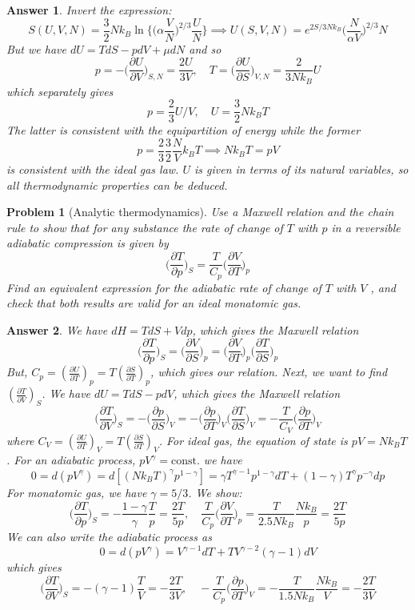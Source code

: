 \documentclass[a4paper]{article}
\theoremstyle{new2}
\newtheorem{ans}{Answer}[section]
\theoremstyle{new}
\newtheorem{qns}{Problem}[section]
\begin{document}
\begin{ans}
Invert the expression:
$$S(U,V,N)=\frac{3}{2}Nk_B\ln\bigg\{\bigg(\alpha\frac{V}{N}\bigg)^{2/3}\frac{U}{N}\bigg\}\implies U(S,V,N)=e^{2S/3Nk_B}\bigg(\frac{N}{\alpha V}\bigg)^{2/3}N$$
But we have $dU=TdS-pdV+\mu dN$ and so
$$p=-\bigg(\frac{\partial U}{\partial V}\bigg)_{S,N}=\frac{2U}{3V},\quad T=\bigg(\frac{\partial U}{\partial S}\bigg)_{V,N}=\frac{2}{3Nk_B}U$$
which separately gives 
$$p=\frac{2}{3}U/V,\quad U=\frac{3}{2}Nk_BT$$
The latter is consistent with the equipartition of energy while the former
$$p=\frac{2}{3}\frac{3}{2}\frac{N}{V}k_BT\implies Nk_BT=pV$$
is consistent with the ideal gas law. $U$ is given in terms of its natural variables, so all thermodynamic properties can be deduced.
\end{ans}
\newpage
\begin{qns}[Analytic thermodynamics]
Use a Maxwell relation and the chain rule to show that for any substance the rate of change of $T$ with $p$ in a reversible adiabatic compression is given by
$$\bigg(\frac{\partial T}{\partial p}\bigg)_S=\frac{T}{C_p}\bigg(\frac{\partial V}{\partial T}\bigg)_p$$
Find an equivalent expression for the adiabatic rate of change of $T$ with $V$ , and check that both results are valid for an ideal monatomic gas.
\end{qns}
\begin{ans}
We have $dH=TdS+Vdp$, which gives the Maxwell relation
$$\bigg(\frac{\partial T}{\partial p}\bigg)_S=\bigg(\frac{\partial V}{\partial S}\bigg)_p=\bigg(\frac{\partial V}{\partial T}\bigg)_p\bigg(\frac{\partial T}{\partial S}\bigg)_p$$
But, $C_p=(\frac{\partial U}{\partial T})_p=T(\frac{\partial S}{\partial T})_p$, which gives our relation. Next, we want to find $(\frac{\partial T}{\partial V})_S$. We have $dU=TdS-pdV$, which gives the Maxwell relation
$$\bigg(\frac{\partial T}{\partial V}\bigg)_S=-\bigg(\frac{\partial p}{\partial S}\bigg)_V=-\bigg(\frac{\partial p}{\partial T}\bigg)_V\bigg(\frac{\partial T}{\partial S}\bigg)_V=-\frac{T}{C_V}\bigg(\frac{\partial p}{\partial T}\bigg)_V$$
where $C_V=(\frac{\partial U}{\partial T})_V=T(\frac{\partial S}{\partial T})_V$. For ideal gas, the equation of state is $pV=Nk_BT$. For an adiabatic process, $pV^\gamma=\text{const.}$ we have
$$0=d(pV^\gamma)=d[(Nk_BT)^\gamma p^{1-\gamma}]=\gamma T^{\gamma-1}p^{1-\gamma}dT+(1-\gamma)T^\gamma p^{-\gamma}dp$$
For monatomic gas, we have $\gamma=5/3$. We show:
$$\bigg(\frac{\partial T}{\partial p}\bigg)_S=-\frac{1-\gamma}{\gamma}\frac{T}{p}=\frac{2T}{5p},\quad \frac{T}{C_p}\bigg(\frac{\partial V}{\partial T}\bigg)_p=\frac{T}{2.5Nk_B}\frac{Nk_B}{p}=\frac{2T}{5p}$$
We can also write the adiabatic process as
$$0=d(pV^\gamma)=V^{\gamma-1}dT+TV^{\gamma-2}(\gamma-1)dV$$
which gives
$$\bigg(\frac{\partial T}{\partial V}\bigg)_S=-(\gamma-1)\frac{T}{V}=-\frac{2T}{3V},\quad -\frac{T}{C_p}\bigg(\frac{\partial p}{\partial T}\bigg)_V=-\frac{T}{1.5Nk_B}\frac{Nk_B}{V}=-\frac{2T}{3V}$$
\end{ans}
\end{document}
